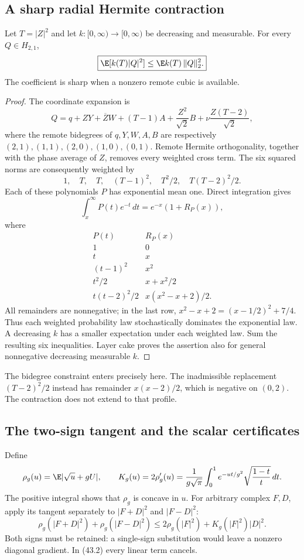 \subsection{A sharp radial Hermite contraction}
\begin{lemma}
\label{lem:radial-h21-contraction}
Let $T=|Z|^2$ and let $k:[0,\infty)\to[0,\infty)$ be decreasing and
measurable. For every $Q\in H_{2,1}$,
\[
 \boxed{\E[k(T)|Q|^2]\le \E k(T)\,\|Q\|_2^2.}
\]
The coefficient is sharp when a nonzero remote cubic is available.
\end{lemma}
\begin{proof}
The coordinate expansion is
\[
 Q=q+ZY+\overline ZW+(T-1)A+\frac{Z^2}{\sqrt2}B
                    +\nu\frac{Z(T-2)}{\sqrt2},
\]
where the remote bidegrees of $q,Y,W,A,B$ are respectively
$(2,1),(1,1),(2,0),(1,0),(0,1)$. Remote Hermite orthogonality,
together with the phase average of $Z$, removes every weighted cross
term. The six squared norms are consequently weighted by
\[
 1,\quad T,\quad T,\quad (T-1)^2,\quad T^2/2,\quad T(T-2)^2/2.
 \tag{43.1}
\]
Each of these polynomials $P$ has exponential mean one. Direct
integration gives
\[
 \int_x^\infty P(t)e^{-t}\,dt=e^{-x}(1+R_P(x)),
\]
where
\[
\begin{array}{c|c}
P(t)&R_P(x)\\ \hline
1&0\\
t&x\\
(t-1)^2&x^2\\
t^2/2&x+x^2/2\\
t(t-2)^2/2&x(x^2-x+2)/2 .
\end{array}
\]
All remainders are nonnegative; in the last row,
$x^2-x+2=(x-1/2)^2+7/4$. Thus each weighted probability law
stochastically dominates the exponential law. A decreasing $k$ has a
smaller expectation under each weighted law. Sum the resulting six
inequalities. Layer cake proves the assertion also for general
nonnegative decreasing measurable $k$.
\end{proof}

The bidegree constraint enters precisely here. The inadmissible
replacement $(T-2)^2/2$ instead has remainder $x(x-2)/2$, which is
negative on $(0,2)$. The contraction does not extend to that profile.

\subsection{The two-sign tangent and the scalar certificates}
Define
\[
 \rho_g(u)=\E|\sqrt u+gU|,\qquad
 K_g(u)=2\rho'_g(u)
 =\frac1{g\sqrt\pi}\int_0^1e^{-ut/g^2}
                    \sqrt{\frac{1-t}{t}}\,dt.
\]
The positive integral shows that $\rho_g$ is concave in $u$.
For arbitrary complex $F,D$, apply its tangent separately to
$|F+D|^2$ and $|F-D|^2$:
\[
 \rho_g(|F+D|^2)+\rho_g(|F-D|^2)
 \le2\rho_g(|F|^2)+K_g(|F|^2)|D|^2.
 \tag{43.2}
\]
Both signs must be retained: a single-sign substitution would leave a
nonzero diagonal gradient. In (43.2) every linear term cancels.

